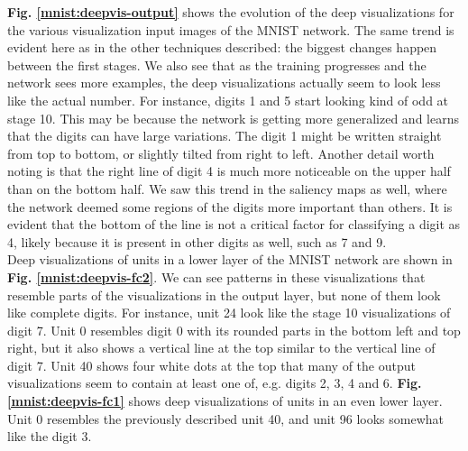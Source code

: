 \textbf{Fig. \ref{mnist:deepvis-output}} shows the evolution of the deep visualizations for the various visualization input images of the MNIST network. The same trend is evident here as in the other techniques described: the biggest changes happen between the first stages. We also see that as the training progresses and the network sees more examples, the deep visualizations actually seem to look less like the actual number. For instance, digits 1 and 5 start looking kind of odd at stage 10. This may be because the network is getting more generalized and learns that the digits can have large variations. The digit 1 might be written straight from top to bottom, or slightly tilted from right to left. Another detail worth noting is that the right line of digit 4 is much more noticeable on the upper half than on the bottom half. We saw this trend in the saliency maps as well, where the network deemed some regions of the digits more important than others. It is evident that the bottom of the line is not a critical factor for classifying a digit as 4, likely because it is present in other digits as well, such as 7 and 9.\\

\noindent Deep visualizations of units in a lower layer of the MNIST network are shown in \textbf{Fig. \ref{mnist:deepvis-fc2}}. We can see patterns in these visualizations that resemble parts of the visualizations in the output layer, but none of them look like complete digits. For instance, unit 24 look like the stage 10 visualizations of digit 7. Unit 0 resembles digit 0 with its rounded parts in the bottom left and top right, but it also shows a vertical line at the top similar to the vertical line of digit 7. Unit 40 shows four white dots at the top that many of the output visualizations seem to contain at least one of, e.g. digits 2, 3, 4 and 6. \textbf{Fig. \ref{mnist:deepvis-fc1}} shows deep visualizations of units in an even lower layer. Unit 0 resembles the previously described unit 40, and unit 96 looks somewhat like the digit 3.\\


